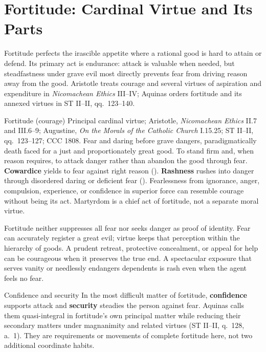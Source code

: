 \section{Fortitude: Cardinal Virtue and Its Parts}
\label{sec:fortitude}

Fortitude perfects the irascible appetite where a rational good is hard to attain or defend. Its primary act is endurance: attack is valuable when needed, but steadfastness under grave evil most directly prevents fear from driving reason away from the good. Aristotle treats courage and several virtues of aspiration and expenditure in \emph{Nicomachean Ethics} III--IV; Aquinas orders fortitude and its annexed virtues in ST II--II, qq.~123--140.


\virtuedossier
  {Fortitude (courage)}
  {Principal cardinal virtue; Aristotle, \emph{Nicomachean Ethics} II.7 and III.6--9; Augustine, \emph{On the Morals of the Catholic Church} I.15.25; ST II--II, qq.~123--127; CCC 1808.}
  {Fear and daring before grave dangers, paradigmatically death faced for a just and proportionately great good.}
  {To stand firm and, when reason requires, to attack danger rather than abandon the good through fear.}
  {\textbf{Cowardice} yields to fear against right reason ().}
  {\textbf{Rashness} rushes into danger through disordered daring or deficient fear ().}
  {Fearlessness from ignorance, anger, compulsion, experience, or confidence in superior force can resemble courage without being its act. Martyrdom is a chief act of fortitude, not a separate moral virtue.}

Fortitude neither suppresses all fear nor seeks danger as proof of identity. Fear can accurately register a great evil; virtue keeps that perception within the hierarchy of goods. A prudent retreat, protective concealment, or appeal for help can be courageous when it preserves the true end. A spectacular exposure that serves vanity or needlessly endangers dependents is rash even when the agent feels no fear.


\begin{studybox}{Confidence and security}
In the most difficult matter of fortitude, \textbf{confidence} supports attack and \textbf{security} steadies the person against fear. Aquinas calls them quasi-integral in fortitude's own principal matter while reducing their secondary matters under magnanimity and related virtues (ST II--II, q.~128, a.~1). They are requirements or movements of complete fortitude here, not two additional coordinate habits.
\end{studybox}

